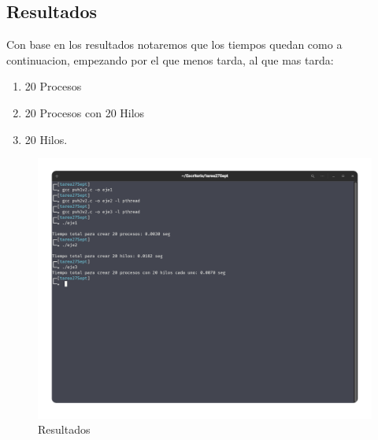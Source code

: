 \documentclass[10pt]{article}
\begin{document}
	\subsection{Resultados}
	Con base en los resultados notaremos que los tiempos quedan como a continuacion, empezando por el que menos tarda, al que mas tarda: 
	\begin{enumerate}
		\item 20 Procesos
		\item 20 Procesos con 20 Hilos
		\item 20 Hilos.
	\end{enumerate}
		\begin{figure}[h!]
		\centering
		\includegraphics[width=\linewidth]{resultados.png}
		\caption{Resultados }
		\label{fig:res}
	\end{figure}
\end{document}
